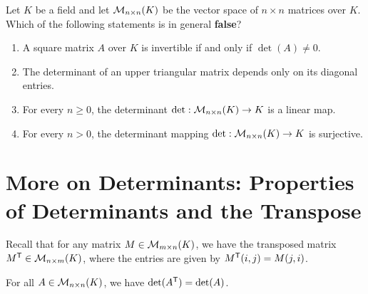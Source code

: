 \begin{exercise}
  \label{exc:determinant_properties_linearity_sc}
  Let $K$ be a field and let $\mathcal{M}_{n \times n}(K)$ be the vector space of $n \times n$ matrices over $K$. Which of the following statements is in general \textbf{false}?
  \begin{enumerate}[label=\textbf{(\alph*)}]
    \item A square matrix $A$ over $K$ is invertible if and only if $\det(A) \neq 0$.
    \item The determinant of an upper triangular matrix depends only on its diagonal entries.
    \item For every $n \ge 0$, the determinant $\det : \mathcal{M}_{n \times n}(K) \to K$ is a linear map.
    \item For every $n > 0$, the determinant mapping $\det : \mathcal{M}_{n \times n}(K) \to K$ is surjective.
  \end{enumerate}
\end{exercise}

\renewcommand{\thetheorem}{20.c.\arabic{theorem}}
\setcounter{theorem}{0}
\section{More on Determinants: Properties of Determinants and the Transpose}

Recall that for any matrix $M \in \mathcal{M}_{m \times n}(K)$, we have the transposed matrix $M^{\mathsf{T}} \in \mathcal{M}_{n \times m}(K)$, where the entries are given by $M^{\mathsf{T}}(i,j) = M(j,i)$.

\begin{theorem}
  \label{thm:det_transpose}
  For all $A \in \mathcal{M}_{n \times n}(K)$, we have $\det(A^{\mathsf{T}}) = \det(A)$.
\end{theorem}

